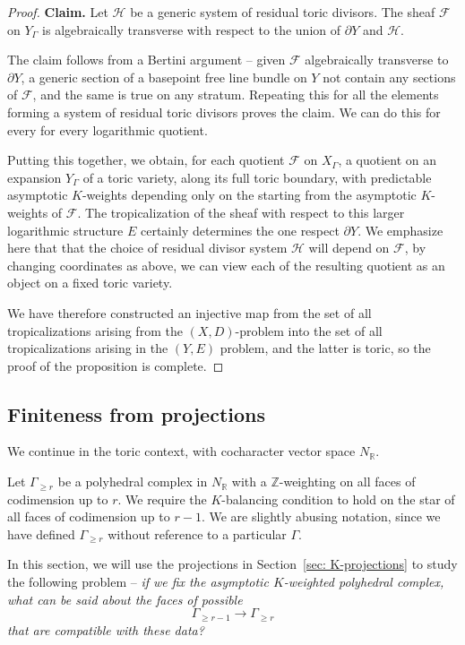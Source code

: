 \documentclass[11pt]{amsart}
\theoremstyle{definition}
\theoremstyle{definition}
\begin{document}
\begin{proof}
\noindent
{\bf Claim.} Let $\mathcal H$ be a generic system of residual toric divisors. The sheaf $\mathcal F$ on $Y_\Gamma$ is algebraically transverse with respect to the union of $\partial Y$ and $\mathcal H$. 

The claim follows from a Bertini argument -- given $\mathcal F$ algebraically transverse to $\partial Y$, a generic section of a basepoint free line bundle on $Y$ not contain any sections of $\mathcal F$, and the same is true on any stratum. Repeating this for all the elements forming a system of residual toric divisors proves the claim. We can do this for every for every logarithmic quotient. 

Putting this together, we obtain, for each quotient $\mathcal F$ on $X_\Gamma$, a quotient on an expansion $Y_\Gamma$ of a toric variety, along its full toric boundary, with predictable asymptotic $K$-weights depending only on the starting from the asymptotic $K$-weights of $\mathcal F$. The tropicalization of the sheaf with respect to this larger logarithmic structure $E$ certainly determines the one respect $\partial Y$. We emphasize here that that the choice of residual divisor system $\mathcal H$ will depend on $\mathcal F$, by changing coordinates as above, we can view each of the resulting quotient as an object on a fixed toric variety. 

We have therefore constructed an injective map from the set of all tropicalizations arising from the $(X,D)$-problem into the set of all tropicalizations arising in the $(Y,E)$ problem, and the latter is toric, so the proof of the proposition is complete. 
\end{proof}

\subsection{Finiteness from projections} We continue in the toric context, with cocharacter vector space $N_{\mathbb R}$. 

Let $\Gamma_{\geq r}$ be a polyhedral complex in $N_{\mathbb R}$ with a $\mathbb Z$-weighting on all faces of codimension up to $r$. We require the $K$-balancing condition to hold on the star of all faces of codimension up to $r-1$. We are slightly abusing notation, since we have defined  $\Gamma_{\geq r}$ without reference to a particular $\Gamma$. 

In this section, we will use the projections in Section~\ref{sec: K-projections} to study the following problem -- {\it if we fix the asymptotic $K$-weighted polyhedral complex, what can be said about the faces of possible
\[
\Gamma_{\geq r-1}\to \Gamma_{\geq r}
\]
that are compatible with these data?}
\end{document}
